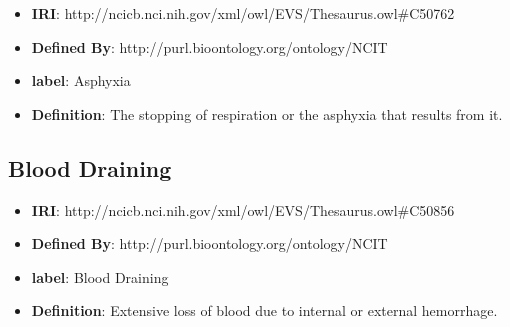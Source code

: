 \documentclass[a4paper,12pt,oneside]{article}
\begin{document}
 \begin{itemize}
 	\item \textbf{IRI}:  	 	
 	http://ncicb.nci.nih.gov/xml/owl/EVS/Thesaurus.owl\#C50762
 	\item \textbf{Defined By}: http://purl.bioontology.org/ontology/NCIT
 	\item \textbf{label}: Asphyxia
 	\item \textbf{Definition}: The stopping of respiration or the asphyxia that results from it.
 \end{itemize}  
  
    \subsection{Blood Draining}
  
  \begin{itemize}
  	\item \textbf{IRI}:  	 	
  	http://ncicb.nci.nih.gov/xml/owl/EVS/Thesaurus.owl\#C50856
  	\item \textbf{Defined By}: http://purl.bioontology.org/ontology/NCIT
  	\item \textbf{label}: Blood Draining
  	\item \textbf{Definition}: Extensive loss of blood due to internal or external hemorrhage.
  \end{itemize}  
  
  \nocite{JS06}

  \newpage
  \printbibliography
  
\end{document}
